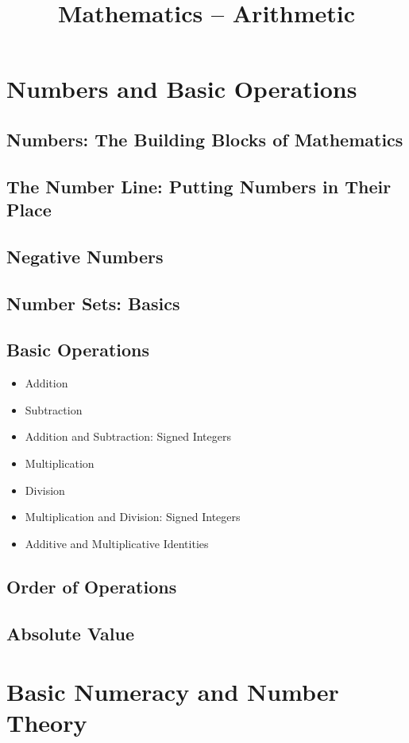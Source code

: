 \documentclass[11pt]{article}
\title{Mathematics -- Arithmetic}
\author{}
\date{}
\begin{document}
\maketitle


\section{Numbers and Basic Operations}
\subsection{Numbers: The Building Blocks of Mathematics}
\subsection{The Number Line: Putting Numbers in Their Place}
\subsection{Negative Numbers}
\subsection{Number Sets: Basics}
\subsection{Basic Operations}
\begin{itemize}
    \item Addition
    \item Subtraction
    \item Addition and Subtraction: Signed Integers
    \item Multiplication
    \item Division
    \item Multiplication and Division: Signed Integers
    \item Additive and Multiplicative Identities
\end{itemize}
\subsection{Order of Operations}
\subsection{Absolute Value}

\section{Basic Numeracy and Number Theory}
\end{document}
